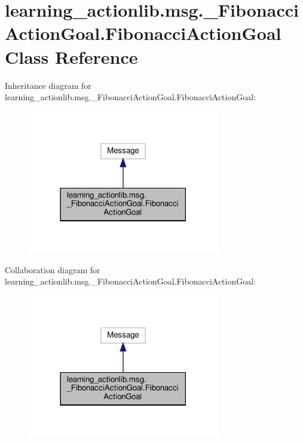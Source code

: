 \hypertarget{classlearning__actionlib_1_1msg_1_1__FibonacciActionGoal_1_1FibonacciActionGoal}{}\section{learning\+\_\+actionlib.\+msg.\+\_\+\+Fibonacci\+Action\+Goal.\+Fibonacci\+Action\+Goal Class Reference}
\label{classlearning__actionlib_1_1msg_1_1__FibonacciActionGoal_1_1FibonacciActionGoal}


Inheritance diagram for learning\+\_\+actionlib.\+msg.\+\_\+\+Fibonacci\+Action\+Goal.\+Fibonacci\+Action\+Goal\+:
\nopagebreak
\begin{figure}[H]
\begin{center}
\leavevmode
\includegraphics[width=237pt]{classlearning__actionlib_1_1msg_1_1__FibonacciActionGoal_1_1FibonacciActionGoal__inherit__graph}
\end{center}
\end{figure}


Collaboration diagram for learning\+\_\+actionlib.\+msg.\+\_\+\+Fibonacci\+Action\+Goal.\+Fibonacci\+Action\+Goal\+:
\nopagebreak
\begin{figure}[H]
\begin{center}
\leavevmode
\includegraphics[width=237pt]{classlearning__actionlib_1_1msg_1_1__FibonacciActionGoal_1_1FibonacciActionGoal__coll__graph}
\end{center}
\end{figure}
